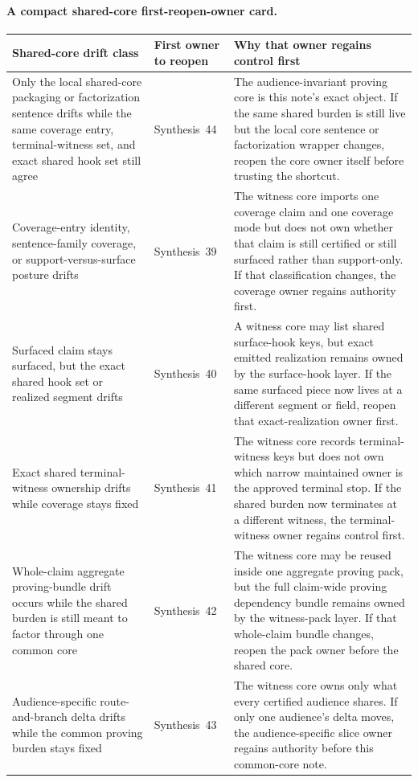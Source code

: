 \documentclass[11pt]{article}
\begin{document}
\paragraph{A compact shared-core first-reopen-owner card.}
\begin{table}[t]
\centering
\small
\begin{tabularx}{\linewidth}{@{}L Y Y@{}}
\toprule
Shared-core drift class & First owner to reopen & Why that owner regains control first \\
\midrule
Only the local shared-core packaging or factorization sentence drifts while the same coverage entry, terminal-witness set, and exact shared hook set still agree & Synthesis~44 & The audience-invariant proving core is this note's exact object. If the same shared burden is still live but the local core sentence or factorization wrapper changes, reopen the core owner itself before trusting the shortcut. \\
Coverage-entry identity, sentence-family coverage, or support-versus-surface posture drifts & Synthesis~39 & The witness core imports one coverage claim and one coverage mode but does not own whether that claim is still certified or still surfaced rather than support-only. If that classification changes, the coverage owner regains authority first. \\
Surfaced claim stays surfaced, but the exact shared hook set or realized segment drifts & Synthesis~40 & A witness core may list shared surface-hook keys, but exact emitted realization remains owned by the surface-hook layer. If the same surfaced piece now lives at a different segment or field, reopen that exact-realization owner first. \\
Exact shared terminal-witness ownership drifts while coverage stays fixed & Synthesis~41 & The witness core records terminal-witness keys but does not own which narrow maintained owner is the approved terminal stop. If the shared burden now terminates at a different witness, the terminal-witness owner regains control first. \\
Whole-claim aggregate proving-bundle drift occurs while the shared burden is still meant to factor through one common core & Synthesis~42 & The witness core may be reused inside one aggregate proving pack, but the full claim-wide proving dependency bundle remains owned by the witness-pack layer. If that whole-claim bundle changes, reopen the pack owner before the shared core. \\
Audience-specific route-and-branch delta drifts while the common proving burden stays fixed & Synthesis~43 & The witness core owns only what every certified audience shares. If only one audience's delta moves, the audience-specific slice owner regains authority before this common-core note. \\

\end{tabularx}
\end{table}
\end{document}
